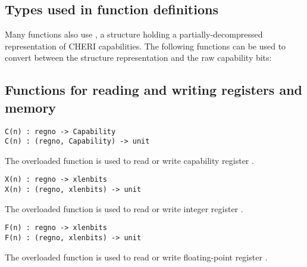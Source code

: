 \label{sailRISCVzzones}

\subsection*{Types used in function definitions}


\medskip
\noindent
Many functions also use , a structure holding a
partially-decompressed representation of CHERI capabilities.
%
The following functions can be used to convert between the structure
representation and the raw capability bits:

\medskip%

\subsection*{Functions for reading and writing registers and memory}

\begin{lstlisting}[language=sail,label=sailRISCVzC]
C(n) : regno -> Capability
C(n) : (regno, Capability) -> unit
\end{lstlisting}
\hspace{\parindent}
The overloaded function  is used to read or write capability register .

\medskip
\begin{lstlisting}[language=sail,label=sailRISCVzX]
X(n) : regno -> xlenbits
X(n) : (regno, xlenbits) -> unit
\end{lstlisting}
\hspace{\parindent}
The overloaded function  is used to read or write integer register .

\medskip
\begin{lstlisting}[language=sail,label=sailRISCVzF]
F(n) : regno -> xlenbits
F(n) : (regno, xlenbits) -> unit
\end{lstlisting}
\hspace{\parindent}
The overloaded function  is used to read or write floating-point register .

\medskip
{}

